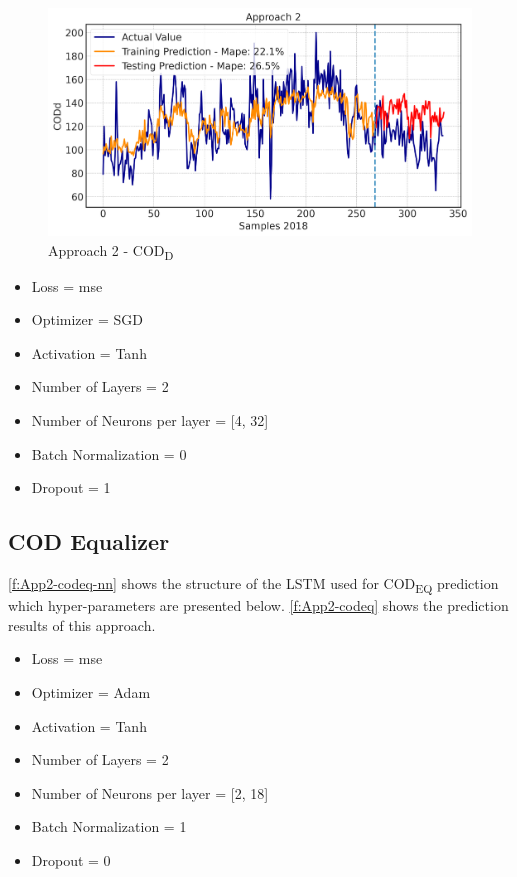 \begin{figure}[h!]
\centering
\includegraphics[width=\linewidth]{figures/Ch5/CODd-2.pdf}
\caption{Approach 2 - COD\textsubscript{D}}
\label{f:App2-codd}
\end{figure}

\begin{itemize}
    \item Loss = mse
    \item Optimizer = SGD
    \item Activation =  Tanh
    \item Number of Layers = 2
    \item Number of Neurons per layer = [4, 32]
    \item Batch Normalization = 0
    \item Dropout = 1
\end{itemize}

\subsection{COD Equalizer}
\autoref{f:App2-codeq-nn} shows the structure of the \ac{LSTM} used for \ac{COD}\textsubscript{EQ} prediction which hyper-parameters are presented below. \autoref{f:App2-codeq} shows the prediction results of this approach.

\begin{itemize}
    \item Loss = mse
    \item Optimizer = Adam
    \item Activation =  Tanh
    \item Number of Layers = 2
    \item Number of Neurons per layer = [2, 18]
    \item Batch Normalization = 1
    \item Dropout = 0
\end{itemize}

